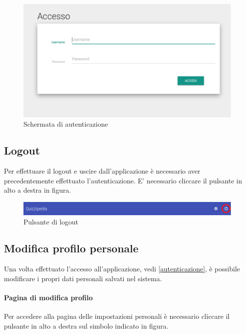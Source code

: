 \documentclass[12pt,a4paper]{article}
\begin{document}
		\begin{figure}[h]
		
		\centering
		\includegraphics[width=\linewidth]{../img/screenshot/loginCrop.png}
		\caption{Schermata di autenticazione}
		\label{Schermata di autenticazione}
		\end{figure}
		
		
	\subsection{Logout}
	Per effettuare il logout e uscire dall'applicazione è necessario aver precedentemente effettuato l'autenticazione.
	E' necessario cliccare il pulsante in alto a destra in figura.
	\begin{figure}[h]	
		\centering
		\includegraphics[width=1.0\linewidth]{../img/screenshot/barraLogout.png}
		\caption{Pulsante di logout}
		\label{Pulsante di logout}
	\end{figure}

	\subsection{Modifica profilo personale}
	Una volta effettuato l'accesso all'applicazione, vedi \ref{autenticazione}, è possibile modificare i propri dati personali salvati nel sistema.
    
	\paragraph{Pagina di modifica profilo}
	Per accedere alla pagina delle impostazioni personali è necessario cliccare il pulsante in alto a destra sul simbolo indicato in figura.
	
\end{document}
